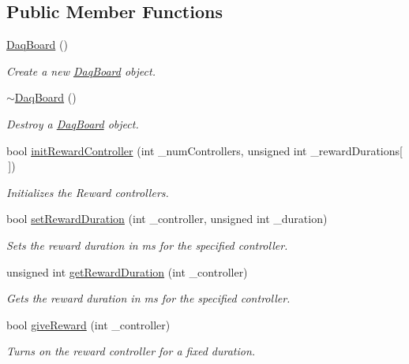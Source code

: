 \subsection*{Public Member Functions}
\begin{DoxyCompactItemize}
\item 
\hyperlink{class_daq_board_aeac12e2acf5b870ada4d69bdf32c05c6}{Daq\-Board} ()
\begin{DoxyCompactList}\small\item\em Create a new \hyperlink{class_daq_board}{Daq\-Board} object. \end{DoxyCompactList}\item 
\hyperlink{class_daq_board_ac8ecec1806ad926d40ebc6117a14e2b2}{$\sim$\-Daq\-Board} ()
\begin{DoxyCompactList}\small\item\em Destroy a \hyperlink{class_daq_board}{Daq\-Board} object. \end{DoxyCompactList}\item 
bool \hyperlink{class_daq_board_acdde7e172d7395f9595db581409ca1cc}{init\-Reward\-Controller} (int \-\_\-num\-Controllers, unsigned int \-\_\-reward\-Durations\mbox{[}$\,$\mbox{]})
\begin{DoxyCompactList}\small\item\em Initializes the Reward controllers. \end{DoxyCompactList}\item 
bool \hyperlink{class_daq_board_afaf10ff6931efd919289e1c6f48ef69d}{set\-Reward\-Duration} (int \-\_\-controller, unsigned int \-\_\-duration)
\begin{DoxyCompactList}\small\item\em Sets the reward duration in ms for the specified controller. \end{DoxyCompactList}\item 
unsigned int \hyperlink{class_daq_board_ae84119b95800ace4d9256935f9c4daed}{get\-Reward\-Duration} (int \-\_\-controller)
\begin{DoxyCompactList}\small\item\em Gets the reward duration in ms for the specified controller. \end{DoxyCompactList}\item 
bool \hyperlink{class_daq_board_a1f7ada581ac4a6e2aad030f5462c6c64}{give\-Reward} (int \-\_\-controller)
\begin{DoxyCompactList}\small\item\em Turns on the reward controller for a fixed duration. \end{DoxyCompactList}\item 

\end{DoxyCompactItemize}
